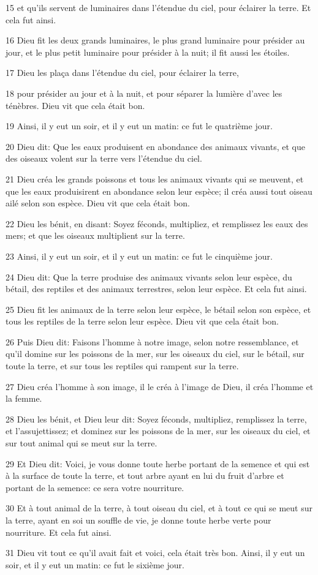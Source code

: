 \par 15 et qu'ils servent de luminaires dans l'étendue du ciel, pour éclairer la terre. Et cela fut ainsi.
\par 16 Dieu fit les deux grands luminaires, le plus grand luminaire pour présider au jour, et le plus petit luminaire pour présider à la nuit; il fit aussi les étoiles.
\par 17 Dieu les plaça dans l'étendue du ciel, pour éclairer la terre,
\par 18 pour présider au jour et à la nuit, et pour séparer la lumière d'avec les ténèbres. Dieu vit que cela était bon.
\par 19 Ainsi, il y eut un soir, et il y eut un matin: ce fut le quatrième jour.
\par 20 Dieu dit: Que les eaux produisent en abondance des animaux vivants, et que des oiseaux volent sur la terre vers l'étendue du ciel.
\par 21 Dieu créa les grands poissons et tous les animaux vivants qui se meuvent, et que les eaux produisirent en abondance selon leur espèce; il créa aussi tout oiseau ailé selon son espèce. Dieu vit que cela était bon.
\par 22 Dieu les bénit, en disant: Soyez féconds, multipliez, et remplissez les eaux des mers; et que les oiseaux multiplient sur la terre.
\par 23 Ainsi, il y eut un soir, et il y eut un matin: ce fut le cinquième jour.
\par 24 Dieu dit: Que la terre produise des animaux vivants selon leur espèce, du bétail, des reptiles et des animaux terrestres, selon leur espèce. Et cela fut ainsi.
\par 25 Dieu fit les animaux de la terre selon leur espèce, le bétail selon son espèce, et tous les reptiles de la terre selon leur espèce. Dieu vit que cela était bon.
\par 26 Puis Dieu dit: Faisons l'homme à notre image, selon notre ressemblance, et qu'il domine sur les poissons de la mer, sur les oiseaux du ciel, sur le bétail, sur toute la terre, et sur tous les reptiles qui rampent sur la terre.
\par 27 Dieu créa l'homme à son image, il le créa à l'image de Dieu, il créa l'homme et la femme.
\par 28 Dieu les bénit, et Dieu leur dit: Soyez féconds, multipliez, remplissez la terre, et l'assujettissez; et dominez sur les poissons de la mer, sur les oiseaux du ciel, et sur tout animal qui se meut sur la terre.
\par 29 Et Dieu dit: Voici, je vous donne toute herbe portant de la semence et qui est à la surface de toute la terre, et tout arbre ayant en lui du fruit d'arbre et portant de la semence: ce sera votre nourriture.
\par 30 Et à tout animal de la terre, à tout oiseau du ciel, et à tout ce qui se meut sur la terre, ayant en soi un souffle de vie, je donne toute herbe verte pour nourriture. Et cela fut ainsi.
\par 31 Dieu vit tout ce qu'il avait fait et voici, cela était très bon. Ainsi, il y eut un soir, et il y eut un matin: ce fut le sixième jour.

